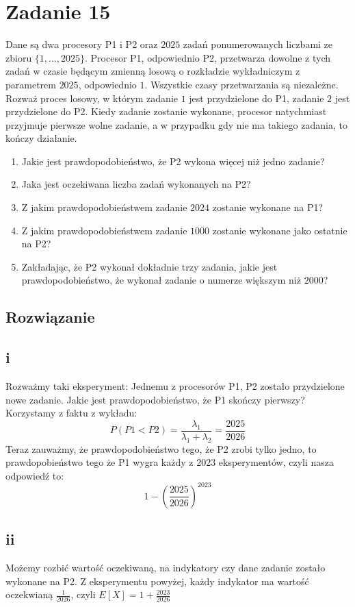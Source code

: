 \section{Zadanie 15}
Dane są dwa procesory P1 i P2 oraz \(2025\) zadań ponumerowanych liczbami
ze zbioru \(\{1, \ldots, 2025\}\). Procesor P1, odpowiednio P2, przetwarza dowolne z tych zadań
w czasie będącym zmienną losową o rozkładzie wykładniczym z parametrem \(2025\), odpowiednio \(1\).
Wszystkie czasy przetwarzania są niezależne. Rozważ proces losowy, w którym
zadanie \(1\) jest przydzielone do P1, zadanie \(2\) jest przydzielone do P2. Kiedy zadanie zostanie
wykonane, procesor natychmiast przyjmuje pierwsze wolne zadanie, a w przypadku
gdy nie ma takiego zadania, to kończy działanie.
\begin{enumerate}
	\item[(i)] Jakie jest prawdopodobieństwo, że P2 wykona więcej niż jedno zadanie?
	\item[(ii)] Jaka jest oczekiwana liczba zadań wykonanych na P2?
	\item[(iii)] Z jakim prawdopodobieństwem zadanie \(2024\) zostanie wykonane na P1?
	\item[(iv)] Z jakim prawdopodobieństwem zadanie \(1000\) zostanie wykonane jako ostatnie na P2?
	\item[(v)] Zakładając, że P2 wykonał dokładnie trzy zadania, jakie jest prawdopodobieństwo,
	      że wykonał zadanie o numerze większym niż \(2000\)?
\end{enumerate}

\subsection*{Rozwiązanie}
\subsection{i}
Rozważmy taki eksperyment: Jednemu z procesorów P1, P2 zostało przydzielone nowe zadanie. Jakie jest prawdopodobieństwo, że P1 skończy pierwszy? Korzystamy z faktu z wykładu:
\[P(P1 < P2) = \frac{\lambda_1}{\lambda_1+\lambda_2} = \frac{2025}{2026}\]
Teraz zauważmy, że prawdopodobieństwo tego, że P2 zrobi tylko jedno, to prawdopobieństwo tego że P1 wygra każdy z 2023 eksperymentów, czyli nasza odpowiedź to:
\[1-\left( \frac{2025}{2026} \right)^{2023}\]
\subsection{ii}
Możemy rozbić wartość oczekiwaną, na indykatory czy dane zadanie zostało wykonane na P2. Z eksperymentu powyżej, każdy indykator ma wartość oczekwianą \(\frac{1}{2026}\), czyli \(E[X] = 1+\frac{2023}{2026}\)
